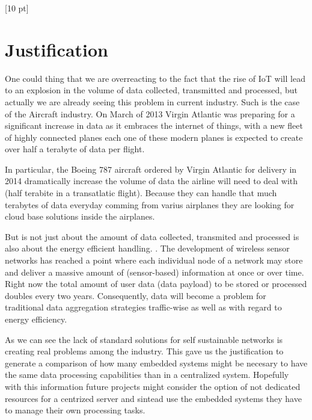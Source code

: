 \titleformat{\chapter}{\Huge\bfseries}{\thechapter}{0 pt}{\rule{340 pt}{3 pt}\\}
\titlespacing{\chapter}{100 pt}{-25 pt}{40 pt}[10 pt]	
\pagestyle{fancy}
\fancyhead[RO,RE]{\thepage}
\fancyfoot[CO,CE]{}

\chapter*{Justification}

\normalsize
\noindent

One could thing that we are overreacting to the fact that the rise of IoT will
lead to an explosion in the volume of data collected, transmitted and
processed, but actually we are already seeing this problem in current industry.
Such is the case of the Aircraft industry. On March of 2013 Virgin Atlantic was
preparing for a significant increase in data as it embraces the internet of
things, with a new fleet of highly connected planes each one of these modern
planes is expected to create over half a terabyte of data per flight.

In particular, the Boeing 787 aircraft ordered by Virgin Atlantic for delivery
in 2014  dramatically increase the volume of data the airline will need to deal
with (half terabite in a transatlatic flight).  Because they can handle that
much terabytes of data everyday comming from varius airplanes they are looking
for cloud base solutions inside the airplanes.


But is not just about the amount of data collected, transmited and processed is
also about the energy efficient handling. \cite{Bergelt}. The development of
wireless sensor networks has reached a point where each individual node of a
network may store and deliver a massive amount of (sensor-based) information at
once or over time.  Right now the total amount of user data (data payload) to
be stored or processed doubles every two years. Consequently, data will become
a problem for traditional data aggregation strategies traffic-wise as well as
with regard to energy efficiency. 


As we can see the lack of standard solutions for self sustainable networks is 
creating real problems among the industry. This gave us the justification to
generate a comparison of how many embedded systems might be necesary to have
the same data processing capabilities than in a centralized system. Hopefully
with this information future projects might consider the option of not
dedicated resources for a centrized server and sintead use the embedded systems
they have to manage their own processing tasks.

\clearpage
